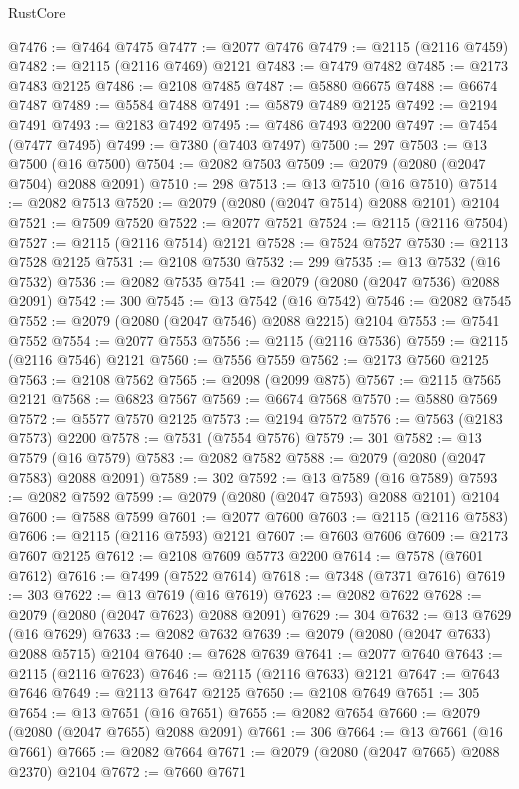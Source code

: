 \begin{lexlean}{RustCore}
\begin{coremodule}
@7476 := @7464 @7475
@7477 := @2077 @7476
@7479 := @2115 (@2116 @7459)
@7482 := @2115 (@2116 @7469) @2121
@7483 := @7479 @7482
@7485 := @2173 @7483 @2125
@7486 := @2108 @7485
@7487 := @5880 @6675
@7488 := @6674 @7487
@7489 := @5584 @7488
@7491 := @5879 @7489 @2125
@7492 := @2194 @7491
@7493 := @2183 @7492
@7495 := @7486 @7493 @2200
@7497 := @7454 (@7477 @7495)
@7499 := @7380 (@7403 @7497)
@7500 := 297
@7503 := @13 @7500 (@16 @7500)
@7504 := @2082 @7503
@7509 := @2079 (@2080 (@2047 @7504) @2088 @2091)
@7510 := 298
@7513 := @13 @7510 (@16 @7510)
@7514 := @2082 @7513
@7520 := @2079 (@2080 (@2047 @7514) @2088 @2101) @2104
@7521 := @7509 @7520
@7522 := @2077 @7521
@7524 := @2115 (@2116 @7504)
@7527 := @2115 (@2116 @7514) @2121
@7528 := @7524 @7527
@7530 := @2113 @7528 @2125
@7531 := @2108 @7530
@7532 := 299
@7535 := @13 @7532 (@16 @7532)
@7536 := @2082 @7535
@7541 := @2079 (@2080 (@2047 @7536) @2088 @2091)
@7542 := 300
@7545 := @13 @7542 (@16 @7542)
@7546 := @2082 @7545
@7552 := @2079 (@2080 (@2047 @7546) @2088 @2215) @2104
@7553 := @7541 @7552
@7554 := @2077 @7553
@7556 := @2115 (@2116 @7536)
@7559 := @2115 (@2116 @7546) @2121
@7560 := @7556 @7559
@7562 := @2173 @7560 @2125
@7563 := @2108 @7562
@7565 := @2098 (@2099 @875)
@7567 := @2115 @7565 @2121
@7568 := @6823 @7567
@7569 := @6674 @7568
@7570 := @5880 @7569
@7572 := @5577 @7570 @2125
@7573 := @2194 @7572
@7576 := @7563 (@2183 @7573) @2200
@7578 := @7531 (@7554 @7576)
@7579 := 301
@7582 := @13 @7579 (@16 @7579)
@7583 := @2082 @7582
@7588 := @2079 (@2080 (@2047 @7583) @2088 @2091)
@7589 := 302
@7592 := @13 @7589 (@16 @7589)
@7593 := @2082 @7592
@7599 := @2079 (@2080 (@2047 @7593) @2088 @2101) @2104
@7600 := @7588 @7599
@7601 := @2077 @7600
@7603 := @2115 (@2116 @7583)
@7606 := @2115 (@2116 @7593) @2121
@7607 := @7603 @7606
@7609 := @2173 @7607 @2125
@7612 := @2108 @7609 @5773 @2200
@7614 := @7578 (@7601 @7612)
@7616 := @7499 (@7522 @7614)
@7618 := @7348 (@7371 @7616)
@7619 := 303
@7622 := @13 @7619 (@16 @7619)
@7623 := @2082 @7622
@7628 := @2079 (@2080 (@2047 @7623) @2088 @2091)
@7629 := 304
@7632 := @13 @7629 (@16 @7629)
@7633 := @2082 @7632
@7639 := @2079 (@2080 (@2047 @7633) @2088 @5715) @2104
@7640 := @7628 @7639
@7641 := @2077 @7640
@7643 := @2115 (@2116 @7623)
@7646 := @2115 (@2116 @7633) @2121
@7647 := @7643 @7646
@7649 := @2113 @7647 @2125
@7650 := @2108 @7649
@7651 := 305
@7654 := @13 @7651 (@16 @7651)
@7655 := @2082 @7654
@7660 := @2079 (@2080 (@2047 @7655) @2088 @2091)
@7661 := 306
@7664 := @13 @7661 (@16 @7661)
@7665 := @2082 @7664
@7671 := @2079 (@2080 (@2047 @7665) @2088 @2370) @2104
@7672 := @7660 @7671

\end{coremodule}
\end{lexlean}
